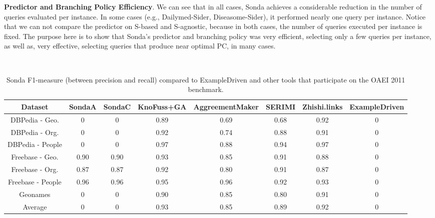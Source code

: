 \textbf{Predictor and Branching Policy Efficiency}. We can see that in all cases, Sonda achieves a considerable reduction in the number of queries evaluated per instance. In some cases (e.g., Dailymed-Sider, Diseasome-Sider), it performed nearly one query per instance. Notice that we can not compare the predictor on S-based and S-agnostic, because in both cases, the number of queries executed per instance is fixed. The purpose here is to show  that Sonda's predictor and branching policy was very efficient, selecting only a few queries per instance, as well as, very effective, selecting queries that produce near optimal PC, in many cases. 


\begin{center}
\begin{table*}[h]
\centering
\scriptsize\tt
\caption{Sonda F1-measure (between precision and recall) compared to ExampleDriven and other tools that participate on the OAEI 2011 benchmark.} 
\begin{tabular}{|c|c|c|c|c|c|c|c|}
\hline
Dataset  &  SondaA  &  SondaC & KnoFuss+GA & AggreementMaker & SERIMI & Zhishi.links & ExampleDriven\\ \hline
DBPedia - Geo. & 0 & 0  & 0.89 & 0.69 & 0.68 & 0.92 & 0 \\ \hline
DBPedia - Org. & 0& 0 & 0.92 & 0.74 & 0.88 & 0.91 & 0\\ \hline
DBPedia - People & 0 & 0 & 0.97 & 0.88 & 0.94 & 0.97 & 0\\ \hline
Freebase - Geo. & 0.90 & 0.90 & 0.93 & 0.85 & 0.91 & 0.88 & 0\\ \hline
Freebase - Org. & 0.87 & 0.87 & 0.92 & 0.80 & 0.91 & 0.87 & 0\\ \hline
Freebase - People & 0.96 &  0.96 & 0.95 & 0.96 & 0.92 & 0.93 & 0\\ \hline
Geonames & 0 & 0  & 0.90 & 0.85 & 0.80 & 0.91 & 0\\ \hline
Average & 0 & 0  & 0.93 & 0.85 & 0.89 &  0.92 & 0\\ \hline											 
\end{tabular}  
\end{table*} 
\end{center}

